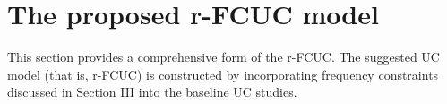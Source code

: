 \documentclass[lettersize,journal]{IEEEtran}
\begin{document}
\vspace{-0.125in}
\section{The proposed r-FCUC model}

This section provides a comprehensive form of the r-FCUC. The suggested UC model (that is, r-FCUC) is constructed by incorporating frequency constraints discussed in Section III into the baseline UC studies.

\end{document}
